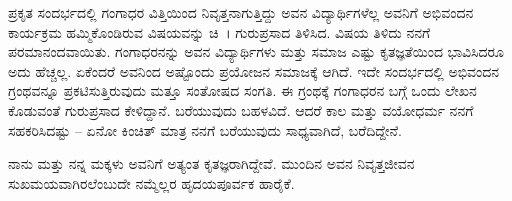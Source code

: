 ಪ್ರಕೃತ ಸಂದರ್ಭದಲ್ಲಿ ಗಂಗಾಧರ ವಿತ್ತಿಯಿಂದ ನಿವೃತ್ತನಾಗುತ್ತಿದ್ದು ಅವನ ವಿದ್ಯಾರ್ಥಿಗಳೆಲ್ಲ ಅವನಿಗೆ ಅಭಿವಂದನ ಕಾರ್ಯಕ್ರಮ ಹಮ್ಮಿಕೊಂಡಿರುವ ವಿಷಯವನ್ನು ಚಿ~। ಗುರುಪ್ರಸಾದ ತಿಳಿಸಿದ. ವಿಷಯ ತಿಳಿದು ನನಗೆ ಪರಮಾನಂದವಾಯಿತು. ಗಂಗಾಧರನನ್ನು ಅವನ ವಿದ್ಯಾರ್ಥಿಗಳು ಮತ್ತು ಸಮಾಜ ಎಷ್ಟು ಕೃತಜ್ಞತೆಯಿಂದ ಭಾವಿಸಿದರೂ ಅದು ಹೆಚ್ಚಲ್ಲ. ಏಕೆಂದರೆ ಅವನಿಂದ ಅಷ್ಟೊಂದು ಪ್ರಯೋಜನ ಸಮಾಜಕ್ಕೆ ಆಗಿದೆ. ಇದೇ ಸಂದರ್ಭದಲ್ಲಿ ಅಭಿವಂದನ ಗ್ರಂಥವನ್ನೂ ಪ್ರಕಟಿಸುತ್ತಿರುವುದು ಮತ್ತೂ ಸಂತೋಷದ ಸಂಗತಿ. ಈ ಗ್ರಂಥಕ್ಕೆ ಗಂಗಾಧರನ ಬಗ್ಗೆ ಒಂದು ಲೇಖನ ಕೊಡುವಂತೆ ಗುರುಪ್ರಸಾದ ಕೇಳಿದ್ದಾನೆ. ಬರೆಯುವುದು ಬಹಳವಿದೆ. ಆದರೆ ಕಾಲ ಮತ್ತು ವಯೋಧರ್ಮ ನನಗೆ ಸಹಕರಿಸಿದಷ್ಟು – ಏನೋ ಕಿಂಚಿತ್ ಮಾತ್ರ ನನಗೆ ಬರೆಯುವುದು ಸಾಧ್ಯವಾಗಿದೆ, ಬರೆದಿದ್ದೇನೆ.  

ನಾನು ಮತ್ತು ನನ್ನ ಮಕ್ಕಳು ಅವನಿಗೆ ಅತ್ಯಂತ ಕೃತಜ್ಞರಾಗಿದ್ದೇವೆ. ಮುಂದಿನ ಅವನ ನಿವೃತ್ತಜೀವನ ಸುಖಮಯವಾಗಿರಲೆಂಬುದೇ ನಮ್ಮೆಲ್ಲರ ಹೃದಯಪೂರ್ವಕ ಹಾರೈಕೆ.

\articleend	
